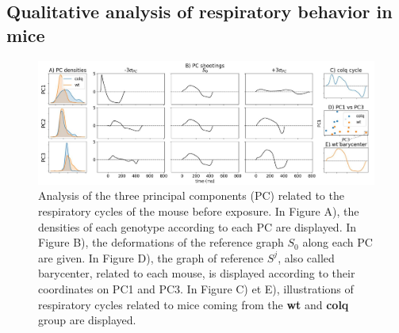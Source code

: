 \subsection{Qualitative analysis of respiratory behavior in mice}
\begin{figure}[t]
  \centering
  \includegraphics[width=0.95\linewidth]{"./pictures/exp_1_bis.pdf"}
  \vspace{-1.5em}
  \caption{Analysis of the three principal components (PC) related to the respiratory cycles of the mouse before exposure.
  In Figure A), the densities of each genotype according to each PC are displayed. In Figure B), the deformations of the reference graph $S_0$ along each PC are given. In Figure D), the graph of reference $S^j$, also called barycenter, related to each mouse, is displayed according to their coordinates on PC1 and PC3. In Figure C) et E), illustrations of respiratory cycles related to mice coming from the \textbf{wt} and \textbf{colq} group are displayed.  }
  \label{fig:exp_1_PCA}
\end{figure}

